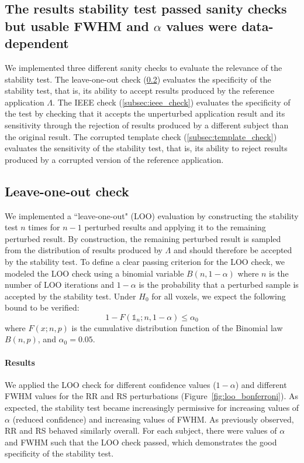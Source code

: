 \documentclass[lettersize,journal]{IEEEtran}
\begin{document}
\subsection{The results stability test passed sanity checks but usable FWHM and \texorpdfstring{$\alpha$}{α} values were data-dependent}

We implemented three different sanity checks to evaluate the relevance of the
stability test. The leave-one-out check (\ref{subsec:loo_check}) evaluates the
specificity of the stability test, that is, its ability to accept results
produced by the reference application $\Lambda$. The IEEE check
(\ref{subsec:ieee_check}) evaluates the specificity of the test by checking
that it accepts the unperturbed application result and its sensitivity through
the rejection of results produced by a different subject than the original
result. The corrupted template check (\ref{subsec:template_check}) evaluates
the sensitivity of the stability test, that is, its ability to reject results
produced by a corrupted version of the reference application.

\subsection{Leave-one-out check}
\label{subsec:loo_check}
We implemented a ``leave-one-out" (LOO) evaluation by constructing the stability test $n$ times for $n-1$ perturbed results and applying it to the remaining perturbed result. By construction, the remaining perturbed result is sampled from the distribution of results produced by $\Lambda$ and should therefore be accepted by the stability test.
To define a clear passing criterion for the LOO check, we modeled the LOO check using a binomial variable $B(n,1-\alpha)$ where $n$ is the number of LOO iterations and $1-\alpha$ is the probability that a perturbed sample is accepted by the stability test. Under $H_0$ for all voxels, we expect the following bound to be verified:
\[
  1-F(\mathds{1}_n;n,1-\alpha) \leq \alpha_0
\]
where $F(x;n,p)$ is the cumulative distribution function of the Binomial law
$B(n,p)$, and $\alpha_0=0.05$.

\paragraph*{Results} We applied the LOO check for different confidence values ($1-\alpha$) and different FWHM  values for the RR and RS perturbations (Figure~\ref{fig:loo_bonferroni}). As expected, the stability test became increasingly permissive for increasing values of $\alpha$ (reduced confidence) and increasing values of FWHM. As previously observed, RR and RS behaved similarly overall. For each subject, there were values of $\alpha$ and FWHM such that the LOO check passed, which demonstrates the good specificity of the stability test.
\end{document}
